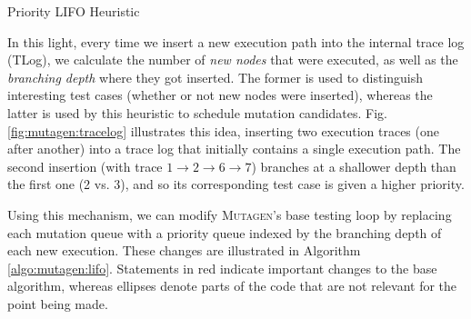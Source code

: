 \documentclass[sigconf,review,anonymous]{acmart}
\newcommand{\mutagen}{\textsc{Mutagen}\xspace}
\begin{document}
\begin{algorithm}[t]
  \SetAlgoLined
  \DontPrintSemicolon

\caption{\label{algo:mutagen:lifo}Priority LIFO Heuristic}
\end{algorithm}


In this light, every time we insert a new execution path into the internal trace
log (TLog), we calculate the number of \emph{new nodes} that were executed, as
well as the \emph{branching depth} where they got inserted.
%
The former is used to distinguish interesting test cases (whether or not new
nodes were inserted), whereas the latter is used by this heuristic to schedule
mutation candidates.
%
Fig. \ref{fig:mutagen:tracelog} illustrates this idea, inserting two execution
traces (one after another) into a trace log that initially contains a single
execution path.
%
The second insertion (with trace $1 \rightarrow 2 \rightarrow 6 \rightarrow 7$)
branches at a shallower depth than the first one (2 vs. 3), and so its
corresponding test case is given a higher priority.


Using this mechanism, we can modify \mutagen's base testing loop by replacing
each mutation queue with a priority queue indexed by the branching depth of each
new execution.
%
These changes are illustrated in Algorithm \ref{algo:mutagen:lifo}.
%
Statements in {\color{red} red} indicate important changes to the base
algorithm, whereas ellipses denote parts of the code that are not relevant for
the point being made.
\end{document}

